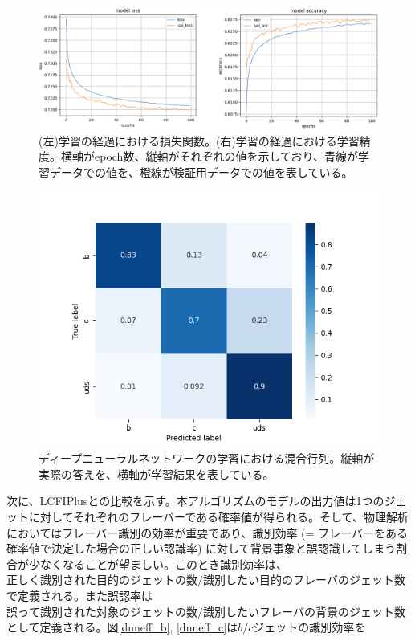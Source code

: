 \begin{figure}[H]
	\begin{center}
 \includegraphics[keepaspectratio, scale=0.3]
 	{Figure/Flavortagging/dnnout.png}
 		\caption[学習経過における損失と精度]{(左)学習の経過における損失関数。(右)学習の経過における学習精度。横軸がepoch数、縦軸がそれぞれの値を示しており、青線が学習データでの値を、橙線が検証用データでの値を表している。}
 		\label{dnnoutput}
	\end{center}
\end{figure}
\begin{figure}[H]
	\begin{center}
 \includegraphics[keepaspectratio, scale=0.5]
 	{Figure/Flavortagging/dnncm.png}
 		\caption[ディープニューラルネットワークの学習における混合行列]{ディープニューラルネットワークの学習における混合行列。縦軸が実際の答えを、横軸が学習結果を表している。}
 		\label{dnncm}
	\end{center}
\end{figure}
次に、LCFIPlusとの比較を示す。本アルゴリズムのモデルの出力値は1つのジェットに対してそれぞれのフレーバーである確率値が得られる。そして、物理解析においてはフレーバー識別の効率が重要であり、識別効率 (= フレーバーをある確率値で決定した場合の正しい認識率) に対して背景事象と誤認識してしまう割合が少なくなることが望ましい。このとき識別効率は、$正しく識別された目的のジェットの数/識別したい目的のフレーバのジェット数$で定義される。また誤認率は$誤って識別された対象のジェットの数/識別したいフレーバの背景のジェット数$として定義される。図\ref{dnneff_b}, \ref{dnneff_c}は$b/c$ジェットの識別効率を
